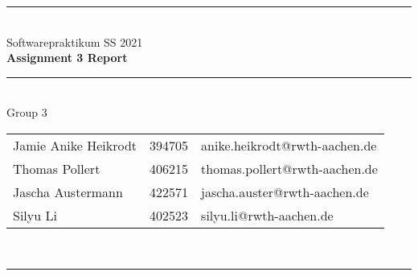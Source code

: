 \documentclass[a4paper,12pt]{article}
\begin{document}
\begin{center}
	\rule{\textwidth}{0.1pt}\\[1cm]
	
	\Large Softwarepraktikum SS 2021\\\bf Assignment 3 Report %
\end{center}


\begin{center}

	\rule{\textwidth}{0.1pt}\\[0.5cm]

	{\Large Group 3\\[5mm]} %

	\begin{tabular}{lll}
		Jamie Anike Heikrodt & 394705 & anike.heikrodt@rwth-aachen.de \\

		Thomas Pollert & 406215 & thomas.pollert@rwth-aachen.de \\
		
		Jascha Austermann & 422571 & jascha.auster@rwth-aachen.de \\

		Silyu Li & 402523 & silyu.li@rwth-aachen.de \\

	\end{tabular}\\[0.5cm]

	\rule{\textwidth}{0.1pt}\\[1cm]
	
\end{center}

\newpage
\tableofcontents





\end{document}
